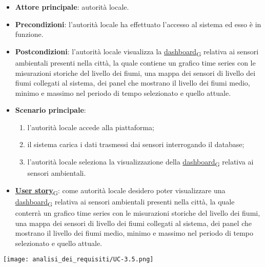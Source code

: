 \newpage
{}
\begin{itemize}
	\item \textbf{Attore principale}: autorità locale.
	\item \textbf{Precondizioni}: l'autorità locale ha effettuato l'accesso al sistema ed esso è in funzione.
	\item \textbf{Postcondizioni}: l'autorità locale visualizza la \href{https://7last.github.io/docs/pb/documentazione-interna/glossario\#dashboard}{dashboard\textsubscript{G}} relativa ai sensori ambientali presenti nella città, la quale contiene un grafico time series con le misurazioni storiche del livello dei fiumi, una mappa dei sensori di livello dei fiumi collegati al sistema, dei panel che mostrano il livello dei fiumi medio, minimo e massimo nel periodo di tempo selezionato e quello attuale.
	\item \textbf{Scenario principale}:
	      \begin{enumerate}
		      \item l'autorità locale accede alla piattaforma;
		      \item il sistema carica i dati trasmessi dai sensori interrogando il database;
		      \item l'autorità locale seleziona la visualizzazione della \href{https://7last.github.io/docs/pb/documentazione-interna/glossario\#dashboard}{dashboard\textsubscript{G}} relativa ai sensori ambientali.
	      \end{enumerate}
	\item \href{https://7last.github.io/docs/pb/documentazione-interna/glossario\#user-story}{\textbf{User story}\textsubscript{G}}:
	      come autorità locale desidero poter visualizzare una \href{https://7last.github.io/docs/pb/documentazione-interna/glossario\#dashboard}{dashboard\textsubscript{G}} relativa ai sensori ambientali presenti nella città, la quale conterrà un grafico time series con le misurazioni storiche del livello dei fiumi, una mappa dei sensori di livello dei fiumi collegati al sistema, dei panel che mostrano il livello dei fiumi medio, minimo e massimo nel periodo di tempo selezionato e quello attuale.
\end{itemize}
\begin{center}
	\texttt{[image: analisi\_dei\_requisiti/UC-3.5.png]}
\end{center}


